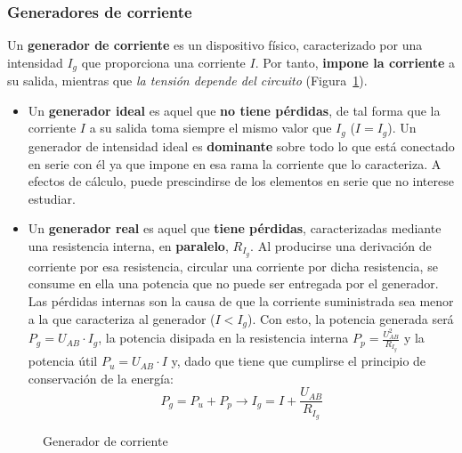 	\subsubsection{Generadores de corriente}
	Un \textbf{generador de corriente} es un dispositivo físico, caracterizado por una intensidad $I_g$ que proporciona una corriente $I$. Por tanto, \textbf{impone la corriente} a su salida, mientras que \emph{la tensión depende del circuito} (Figura~\ref{fig.fuentecorriente}).
	\begin{itemize}
		\item Un \textbf{generador ideal} es aquel que \textbf{no tiene pérdidas}, de tal forma que la corriente $I$ a su salida toma siempre el mismo valor que $I_g$ ($I=I_g$). Un generador de intensidad ideal es \textbf{dominante} sobre todo lo que está conectado en serie con él ya que impone en esa rama la corriente que lo caracteriza. A efectos de cálculo, puede prescindirse de los elementos en serie que no interese estudiar. 
		\item Un \textbf{generador real} es aquel que \textbf{tiene pérdidas}, caracterizadas mediante una resistencia interna, en \textbf{paralelo}, $R_{I_g}$. Al producirse una derivación de corriente por esa resistencia, circular una corriente por dicha resistencia, se consume en ella una potencia que no puede ser entregada por el generador. Las pérdidas internas son la causa de que la corriente suministrada sea menor a la que caracteriza al generador ($I<I_g$). Con esto, la potencia generada será $P_g=U_{AB}\cdot I_g$, la potencia disipada en la resistencia interna $P_p=\frac{U_{AB}^2}{R_{I_g}}$ y la potencia útil $P_u=U_{AB}\cdot I$ y, dado que tiene que cumplirse el principio de conservación de la energía:
		\begin{equation}
			P_g=P_u+P_p\rightarrow \boxed{I_g=I+ \dfrac{U_{AB}}{R_{I_g}}}
		\end{equation}
	\end{itemize}
	\begin{figure}[H]
		\centering
		\hfil
		\caption{Generador de corriente}
		\label{fig.fuentecorriente}
	\end{figure}
	
